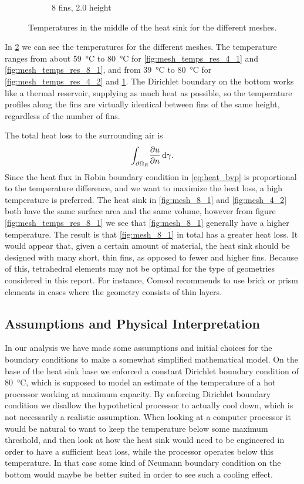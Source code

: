 \begin{figure}[ht]
\begin{subfigure}[t] {0.23\textwidth}
\caption{8 fins, \num{2.0} height}
\label{fig:mesh_temps_res_8_2}
\end{subfigure}
\caption{Temperatures in the middle of the heat sink for the different meshes.}
\label{fig:mesh_temps}
\end{figure}

In \cref{fig:mesh_temps} we can see the temperatures for the different meshes. The temperature ranges from about \SI{59}{\celsius} to \SI{80}{\celsius} for \cref{fig:mesh_temps_res_4_1} and \cref{fig:mesh_temps_res_8_1}, and from \SI{39}{\celsius} to \SI{80}{\celsius} for \cref{fig:mesh_temps_res_4_2} and \cref{fig:mesh_temps_res_8_2}. The Dirichlet boundary on the bottom works like a thermal reservoir, supplying as much heat as possible, so the temperature profiles along the fins are virtually identical between fins of the same height, regardless of the number of fins.

The total heat loss to the surrounding air is
\begin{equation}
\int_{\partial\Omega_R}\! \pdv{u}{n}\, \mathrm{d}{\gamma}.
\end{equation}
Since the heat flux in Robin boundary condition in \cref{eq:heat_bvp} is proportional to the temperature difference, and we want to maximize the heat loss, a high temperature is preferred. The heat sink in \cref{fig:mesh_8_1} and \cref{fig:mesh_4_2} both have the same surface area and the same volume, however from figure \cref{fig:mesh_temps_res_8_1} we see that \cref{fig:mesh_8_1} generally have a higher temperature. The result is that \cref{fig:mesh_8_1} in total has a greater heat loss. It would appear that, given a certain amount of material, the heat sink should be designed with many short, thin fins, as opposed to fewer and higher fins. Because of this, tetrahedral elements may not be optimal for the type of geometries considered in this report. For instance, Comsol \cite{comsol_mesh_types} recommends to use brick or prism elements in cases where the geometry consists of thin layers.

\subsection{Assumptions and Physical Interpretation}
In our analysis we have made some assumptions and initial choices for the boundary conditions to make a somewhat simplified mathematical model. On the base of the heat sink base we enforced a constant Dirichlet boundary condition of \SI{80}{\celsius}, which is supposed to model an estimate of the temperature of a hot processor working at maximum capacity. By enforcing Dirichlet boundary condition we disallow the hypothetical processor to actually cool down, which is not necessarily a realistic assumption. When looking at a computer processor it would be natural to want to keep the temperature below some maximum threshold, and then look at how the heat sink would need to be engineered in order to have a sufficient heat loss, while the processor operates below this temperature. In that case some kind of Neumann boundary condition on the bottom would maybe be better suited in order to see such a cooling effect.

